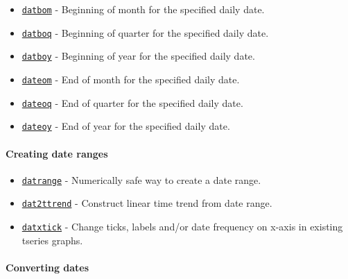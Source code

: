 \begin{itemize}
\itemsep1pt\parskip0pt
\item
  \href{dates/datbom}{\texttt{datbom}} - Beginning of month for the
  specified daily date.
\item
  \href{dates/datboq}{\texttt{datboq}} - Beginning of quarter for the
  specified daily date.
\item
  \href{dates/datboy}{\texttt{datboy}} - Beginning of year for the
  specified daily date.
\item
  \href{dates/dateom}{\texttt{dateom}} - End of month for the specified
  daily date.
\item
  \href{dates/dateoq}{\texttt{dateoq}} - End of quarter for the
  specified daily date.
\item
  \href{dates/dateoy}{\texttt{dateoy}} - End of year for the specified
  daily date.
\end{itemize}

\paragraph{Creating date ranges}\label{creating-date-ranges}

\begin{itemize}
\itemsep1pt\parskip0pt
\item
  \href{dates/datrange}{\texttt{datrange}} - Numerically safe way to
  create a date range.
\item
  \href{dates/dat2ttrend}{\texttt{dat2ttrend}} - Construct linear time
  trend from date range.
\item
  \href{dates/datxtick}{\texttt{datxtick}} - Change ticks, labels and/or
  date frequency on x-axis in existing tseries graphs.
\end{itemize}

\paragraph{Converting dates}\label{converting-dates}

